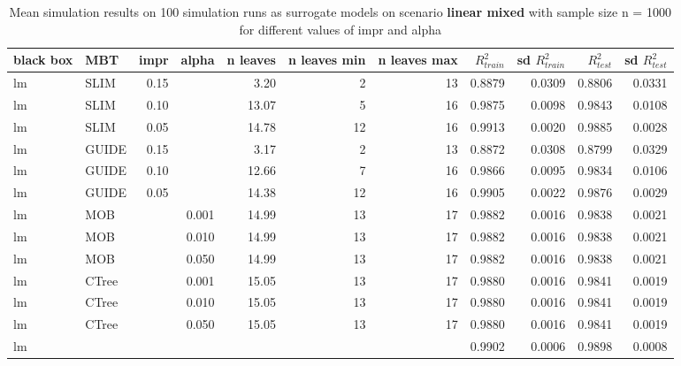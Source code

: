 \begin{table}
\begin{tabular}[t]{l|l|r|r|r|r|r|r|r|r|r}
\end{tabular}
\label{tab:app_linear_abrupt_5000}

\end{table}




\begin{table}

\caption{Mean simulation results on 100 simulation runs as surrogate models on scenario \textbf{linear mixed} with sample size n = 1000 for different values of impr and alpha}
\centering \tiny
\begin{tabular}[t]{l|l|r|r|r|r|r|r|r|r|r}
\hline
black box & MBT & impr & alpha & n leaves & n leaves min & n leaves max &  $R^2_{train}$ & sd $R^2_{train}$ & $R^2_{test}$ & sd $R^2_{test}$\\
\hline
lm & SLIM & 0.15 & & 3.20 & 2 & 13 & 0.8879 & 0.0309 & 0.8806 & 0.0331\\
lm & SLIM & 0.10 & & 13.07 & 5 & 16 & 0.9875 & 0.0098 & 0.9843 & 0.0108\\
lm & SLIM & 0.05 & & 14.78 & 12 & 16 & 0.9913 & 0.0020 & 0.9885 & 0.0028\\
lm & GUIDE & 0.15 & & 3.17 & 2 & 13 & 0.8872 & 0.0308 & 0.8799 & 0.0329\\
lm & GUIDE & 0.10 & & 12.66 & 7 & 16 & 0.9866 & 0.0095 & 0.9834 & 0.0106\\
lm & GUIDE & 0.05 & & 14.38 & 12 & 16 & 0.9905 & 0.0022 & 0.9876 & 0.0029\\
lm & MOB & & 0.001 & 14.99 & 13 & 17 & 0.9882 & 0.0016 & 0.9838 & 0.0021\\
lm & MOB & & 0.010 & 14.99 & 13 & 17 & 0.9882 & 0.0016 & 0.9838 & 0.0021\\
lm & MOB & & 0.050 & 14.99 & 13 & 17 & 0.9882 & 0.0016 & 0.9838 & 0.0021\\
lm & CTree & & 0.001 & 15.05 & 13 & 17 & 0.9880 & 0.0016 & 0.9841 & 0.0019\\
lm & CTree & & 0.010 & 15.05 & 13 & 17 & 0.9880 & 0.0016 & 0.9841 & 0.0019\\
lm & CTree & & 0.050 & 15.05 & 13 & 17 & 0.9880 & 0.0016 & 0.9841 & 0.0019\\

\hline
lm & & & & & & & 0.9902 & 0.0006 & 0.9898 & 0.0008\\
\hline



\end{tabular}
\end{table}
